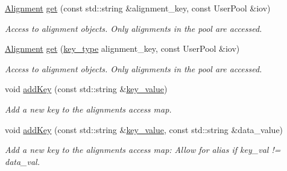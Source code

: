 \begin{DoxyCompactItemize}
\hyperlink{class_d_d4hep_1_1_alignments_1_1_alignment}{Alignment} \hyperlink{class_d_d4hep_1_1_alignments_1_1_interna_1_1_alignment_container_a3f1a415452fb4494cc7ddc2a84b2593a}{get} (const std::string \&alignment\_\-key, const UserPool \&iov)
\begin{DoxyCompactList}\small\item\em Access to alignment objects. Only alignments in the pool are accessed. \item\end{DoxyCompactList}\item 
\hyperlink{class_d_d4hep_1_1_alignments_1_1_alignment}{Alignment} \hyperlink{class_d_d4hep_1_1_alignments_1_1_interna_1_1_alignment_container_ae9d28749c0b244cac8d9206fca1c06fe}{get} (\hyperlink{class_d_d4hep_1_1_alignments_1_1_interna_1_1_alignment_container_a7395f0e25d9e524d2a2bd7df0f4364e6}{key\_\-type} alignment\_\-key, const UserPool \&iov)
\begin{DoxyCompactList}\small\item\em Access to alignment objects. Only alignments in the pool are accessed. \item\end{DoxyCompactList}\item 
void \hyperlink{class_d_d4hep_1_1_alignments_1_1_interna_1_1_alignment_container_aff0df8ea16dc1a811cce12b6f702ce2b}{addKey} (const std::string \&\hyperlink{class_d_d4hep_1_1_alignments_1_1_interna_1_1_alignment_container_a64a96ad5b67f6e67b12fd3aaaa8bbcb8}{key\_\-value})
\begin{DoxyCompactList}\small\item\em Add a new key to the alignments access map. \item\end{DoxyCompactList}\item 
void \hyperlink{class_d_d4hep_1_1_alignments_1_1_interna_1_1_alignment_container_acf31dddb1e9328a25ab5a7539b7b6eb0}{addKey} (const std::string \&\hyperlink{class_d_d4hep_1_1_alignments_1_1_interna_1_1_alignment_container_a64a96ad5b67f6e67b12fd3aaaa8bbcb8}{key\_\-value}, const std::string \&data\_\-value)
\begin{DoxyCompactList}\small\item\em Add a new key to the alignments access map: Allow for alias if key\_\-val != data\_\-val. \item\end{DoxyCompactList}\end{DoxyCompactItemize}

